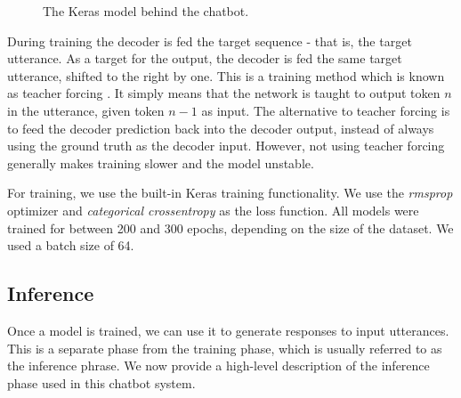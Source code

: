 \documentclass{article}
\begin{document}
\begin{center}
  \begin{figure}[hbt]
    \centering
    \caption{The Keras model behind the chatbot.}
    \label{fig:keras-model}
  \end{figure}
\end{center}
During training the decoder is fed the target sequence - that is, the target
utterance. As a target for the output, the decoder is fed the same target utterance, shifted to the right by one.
This is a training method which is known as teacher forcing
\cite{teacher-forcing}. It simply means that the network is taught to output
token $n$ in the utterance, given token $n-1$ as input. The alternative to
teacher forcing is to feed the decoder prediction back into the decoder output,
instead of always using the ground truth as the decoder input. However, not
using teacher forcing generally makes training slower and the model unstable.

For training, we use the built-in Keras training functionality. We use the
\emph{rmsprop} optimizer and \emph{categorical crossentropy} as the loss
function. All models were trained for between 200 and 300 epochs, depending
on the size of the dataset. We used a batch size of 64.

\subsection*{Inference}

Once a model is trained, we can use it to generate responses to input
utterances. This is a separate phase from the training phase, which is usually
referred to as the inference phrase. We now provide a high-level description
of the inference phase used in this chatbot system.
\end{document}

